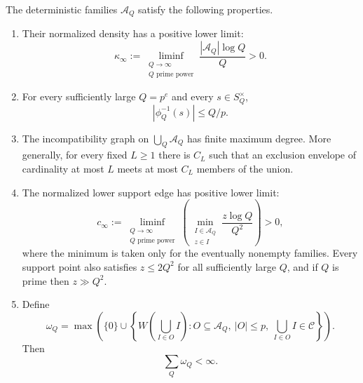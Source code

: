 \begin{proposition}\label{prop:signed-inverse-capabilities}
The deterministic families $\mathcal A_Q$ satisfy the following properties.
\begin{enumerate}
\item Their normalized density has a positive lower limit:
\begin{equation}\label{eq:family-density-liminf}
\kappa_\infty
:=
\liminf_{\substack{Q\to\infty\\Q\text{ prime power}}}
\frac{|\mathcal A_Q|\log Q}{Q}
>0.
\end{equation}
\item For every sufficiently large $Q=p^e$ and every $s\in S_Q^\times$,
\begin{equation}\label{eq:fibre-bound}
|\phi_Q^{-1}(s)|\le Q/p.
\end{equation}
\item The incompatibility graph on $\bigcup_Q\mathcal A_Q$ has finite maximum degree.  More generally, for every fixed $L\ge1$ there is $C_L$ such that an exclusion envelope of cardinality at most $L$ meets at most $C_L$ members of the union.
\item The normalized lower support edge has positive lower limit:
\begin{equation}\label{eq:support-liminf}
c_\infty
:=
\liminf_{\substack{Q\to\infty\\Q\text{ prime power}}}
\left(
\min_{\substack{I\in\mathcal A_Q\\z\in I}}
\frac{z\log Q}{Q^2}
\right)
>0,
\end{equation}
where the minimum is taken only for the eventually nonempty families.  Every support point also satisfies $z\le2Q^2$ for all sufficiently large $Q$, and if $Q$ is prime then $z\gg Q^2$.
\item Define
\begin{equation}\label{eq:canonical-role-mass}
\omega_Q
=
\max\left(
\{0\}\cup
\left\{
W\!\left(\bigcup_{I\in O}I\right):
O\subseteq\mathcal A_Q,\ |O|\le p,\ \bigcup_{I\in O}I\in\mathcal C
\right\}
\right).
\end{equation}
Then
\begin{equation}\label{eq:role-summable}
\sum_Q\omega_Q<\infty.
\end{equation}
\end{enumerate}
\end{proposition}

